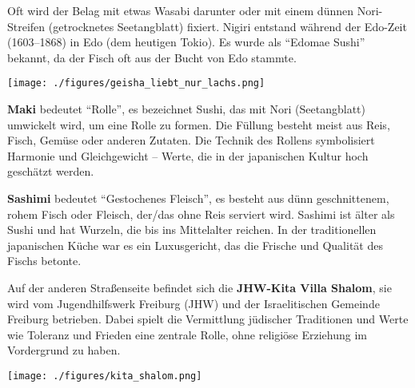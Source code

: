 \documentclass[landscape, a4paper]{article}
\newcommand\alert[1]{\textcolor{PrimaryColor}{\textbf{#1}}}
\begin{document}
\hfill\color{white}%
\vrule width 0.01cm
\hfill\color{black}%
\begin{minipage}[t]{0.31\textwidth}
	\vspace{0cm}
	\setlength{\parskip}{0.25cm}

Oft wird der Belag mit etwas Wasabi darunter oder mit einem dünnen Nori-Streifen (getrocknetes Seetangblatt) fixiert. Nigiri entstand während der Edo-Zeit (1603–1868) in Edo (dem heutigen Tokio). Es wurde als \enquote{Edomae Sushi} bekannt, da der Fisch oft aus der Bucht von Edo stammte.

	\texttt{[image: ./figures/geisha\_liebt\_nur\_lachs.png]}
	\setlength{\parskip}{0.25cm}

  \alert{Maki} bedeutet \enquote{Rolle}, es bezeichnet Sushi, das mit Nori (Seetangblatt) umwickelt wird, um eine Rolle zu formen. Die Füllung besteht meist aus Reis, Fisch, Gemüse oder anderen Zutaten. Die Technik des Rollens symbolisiert Harmonie und Gleichgewicht – Werte, die in der japanischen Kultur hoch geschätzt werden.

  \alert{Sashimi} bedeutet \enquote{Gestochenes Fleisch}, es besteht aus dünn geschnittenem, rohem Fisch oder Fleisch, der/das ohne Reis serviert wird. Sashimi ist älter als Sushi und hat Wurzeln, die bis ins Mittelalter reichen. In der traditionellen japanischen Küche war es ein Luxusgericht, das die Frische und Qualität des Fischs betonte. %

  Auf der anderen Straßenseite befindet sich die \alert{JHW-Kita Villa Shalom}, sie wird vom Jugendhilfswerk Freiburg (JHW) und der Israelitischen Gemeinde Freiburg betrieben. Dabei spielt die Vermittlung jüdischer Traditionen und Werte wie Toleranz und Frieden eine zentrale Rolle, ohne religiöse Erziehung im Vordergrund zu haben.

	\texttt{[image: ./figures/kita\_shalom.png]}
	\setlength{\parskip}{0.25cm}
\end{minipage}%
\end{document}
